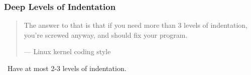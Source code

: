 \begin{frame}

\frametitle{Deep Levels of Indentation}

\begin{quotation}

\footnotesize\sffamily\itshape

\begin{flushright}

The answer to that is that if you need more than 3 levels of indentation,
you're screwed anyway, and should fix your program.

\smallbreak

\upshape

--- Linux kernel coding style

\end{flushright}

\end{quotation}

\vspace{\fill}

\begin{center}

\leftthumbsup~Have at most 2-3 levels of indentation.~\rightthumbsup

\end{center}

\vspace{\fill}

\end{frame}
